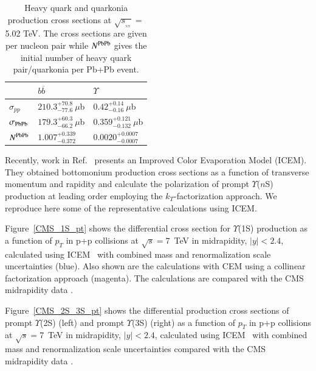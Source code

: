 \begin{table}
  \begin{center}
\caption[]{Heavy quark and quarkonia production  cross sections at
$\sqrt{s_{_{_{NN}}}}=$ 5.02 TeV. The cross sections are given per nucleon pair while
$N^{\rm PbPb}$ gives the initial number of heavy quark pair/quarkonia per Pb+Pb event.}
\label{NLOcros}
\begin{tabular}{l|l|l} 
\hline 
\hline
                        & $ b \overline b$                    & $\Upsilon$   \\              
\hline
$\sigma_{pp}$            & $210.3^{+70.8}_{-77.6}~\mu$b            & $0.42^{+0.14}_{-0.16}~\mu$b  \\


$\sigma_{\rm PbPb}$        & $179.3^{+60.3}_{-66.2}~\mu$b             & 0.359$^{+0.121}_{-0.132}~\mu$b  \\



$N^{\rm PbPb}$              & $1.007^{+0.339}_{-0.372}$               & $0.0020^{+0.0007}_{-0.0007}$   \\

\hline
\hline
\end{tabular}
\end{center}
\end{table}


Recently, work in Ref.~\cite{Cheung:2018upe} presents an Improved Color Evaporation Model
(ICEM). They obtained bottomonium production cross sections as a function of
transverse momentum and rapidity and calculate the polarization of prompt
$\varUpsilon$($n$S) production at leading order employing the $k_T$-factorization approach.
We reproduce here some of the representative calculations using ICEM.

Figure~\ref{CMS_1S_pt} shows the
differential cross section for $\varUpsilon$(1S) production as a function
  of $p_T$ in p+p collisions at $\sqrt{s} = 7$~TeV in midrapidity, $|y|<2.4$, calculated using
ICEM~\cite{Cheung:2018upe} with combined mass and renormalization scale
uncertainties (blue).  Also shown are the calculations with CEM using a collinear
factorization approach (magenta). The calculations are compared with the CMS
midrapidity data \cite{CMS:2013qur}.

Figure~\ref{CMS_2S_3S_pt} shows the
differential production cross sections of prompt $\varUpsilon$(2S) (left)
and prompt $\varUpsilon$(3S) (right) as a function
of $p_T$ in p+p collisions at $\sqrt{s} = 7$~TeV in midrapidity, $|y|<2.4$, 
calculated using ICEM~\cite{Cheung:2018upe} with combined mass and renormalization
scale uncertainties compared with the CMS midrapidity data \cite{CMS:2013qur}.

